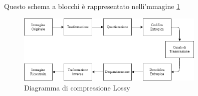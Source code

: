 Questo schema a blocchi è rappresentato nelli'mmagine \ref{fig:LossyCompressorDiagram}\\
\begin{figure}[t!]
    \centering
    \includegraphics[width=0.8\textwidth]{Immagini/LossyCompressorDiagram.png}
    \caption{Diagramma di compressione Lossy}
    \label{fig:LossyCompressorDiagram}
\end{figure}
